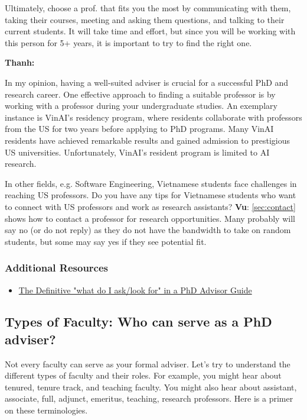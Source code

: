 \documentclass[oneside,11pt]{memoir}
\newenvironment{commentbox}[1][]{
  \small
  \begin{mybox}
    {\small \textbf{#1}}
  }{
  \end{mybox}
}
\begin{document}
Ultimately, choose a prof. that fits you the most by communicating with them, taking their courses, meeting and asking them questions, and talking to their current students. It will take time and effort, but since you will be working with this person for 5+ years, it is important to try to find the right one.

\begin{commentbox}[Thanh:]
  In my opinion, having a well-suited adviser is crucial for a successful PhD and research career. One effective approach to finding a suitable professor is by working with a professor during your undergraduate studies. An exemplary instance is VinAI's residency program, where residents collaborate with professors from the US for two years before applying to PhD programs. Many VinAI residents have achieved remarkable results and gained admission to prestigious US universities. Unfortunately, VinAI's resident program is limited to AI research.

  In other fields, e.g. Software Engineering, Vietnamese students face challenges in reaching US professors. Do you have any tips for Vietnamese students who want to connect with US professors and work as research assistants?
  \tcblower
  \textbf{Vu}: \autoref{sec:contact} shows how to contact a professor for research opportunities. Many probably will say no (or do not reply) as they do not have the bandwidth to take on random students, but some may say yes if they see potential fit.
\end{commentbox}

\subsubsection*{Additional Resources}
\begin{itemize}
  \item \href{https://www.cs.columbia.edu/wp-content/uploads/2019/03/Get-Advisor.pdf}{The Definitive "what do I ask/look for" in a PhD Advisor Guide}
\end{itemize}
\subsection{Types of Faculty: Who can serve as a PhD adviser?}\label{sec:faculty-types}

Not every faculty can serve as your formal adviser. Let's try to understand the different types of faculty and their roles. For example, you might hear about tenured,  tenure track, and teaching faculty.  You might also hear about assistant, associate, full, adjunct, emeritus, teaching, research professors. Here is a primer on these terminologies.
\end{document}

